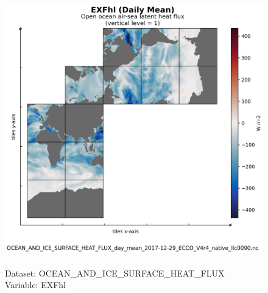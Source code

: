 \begin{figure}[H]
\centering
\includegraphics[scale=0.5]{../images/plots/native_plots/Ocean_and_Sea-Ice_Surface_Heat_Fluxes/EXFhl.png}
\caption{\\Dataset: OCEAN\_AND\_ICE\_SURFACE\_HEAT\_FLUX\\Variable: EXFhl}
\label{tab:table-OCEAN_AND_ICE_SURFACE_HEAT_FLUX_EXFhl-Plot}
\end{figure}
\pagebreak
